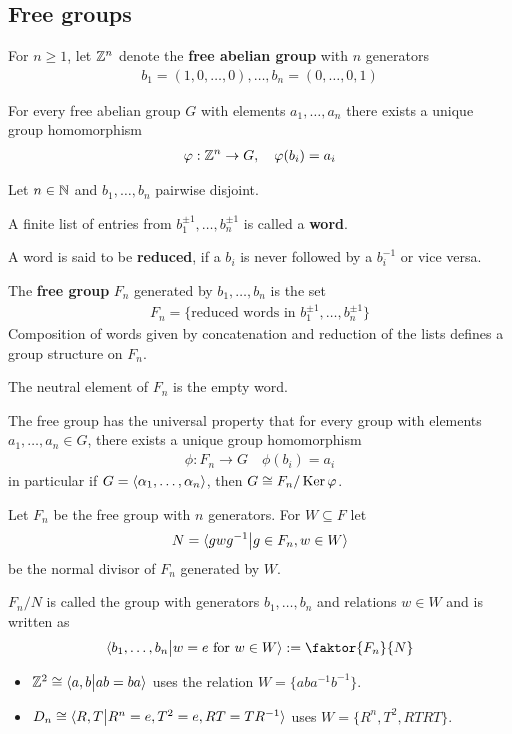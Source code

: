 \subsection{Free groups}
\begin{dfn}[]
For $n \geq 1$, let $\mathbb{Z}^{n}$ denote the \textbf{free abelian group} with $n$ generators
\begin{align*}
  b_1 = (1,0,\ldots,0), \ldots, b_n = (0,\ldots,0,1)
\end{align*}
\end{dfn}


\begin{lem}[]
For every free abelian group $G$ with elements $a_{1}, \ldots, a_{n}$ there exists a unique group homomorphism
\begin{align*}
  \varphi: \mathbb{Z}^{n} \to  G, \quad \varphi(b_i) = a_i
\end{align*}
\end{lem}

\begin{dfn}[]
Let $n \in \mathbb{N}$ and $b_{1}, \ldots, b_{n}$ pairwise disjoint.

A finite list of entries from $b_{1}^{\pm 1}, \ldots,b_{n}^{\pm 1}$ is called a \textbf{word}.

A word is said to be \textbf{reduced}, if a $b_i$ is never followed by a $b_i^{-1}$ or vice versa.

The \textbf{free group} $F_n$ generated by $b_{1}, \ldots, b_{n}$ is the set
\begin{align*}
  F_n = \{\text{reduced words in } b_1^{\pm 1}, \ldots, b_n^{\pm 1}\}
\end{align*}
Composition of words given by concatenation and reduction of the lists defines a group structure on $F_n$.

The neutral element of $F_n$ is the empty word.
\end{dfn}


\begin{thm}[]
The free group has the universal property that for every group with elements $a_{1}, \ldots, a_{n} \in G$, there exists a unique group homomorphism
\begin{align*}
  \phi: F_n \to G \quad \phi(b_i) = a_i
\end{align*}
in particular if $G = \langle\alpha_{1}, \ldots, \alpha_{n}\rangle$, then $G \cong F_n/\operatorname{Ker} \varphi$.
\end{thm}

\begin{dfn}[]
Let $F_n$ be the free group with $n$ generators.
For $W \subseteq F$ let
\begin{align*}
  N = \langle gwg^{-1} \big\vert g \in F_n, w \in W\rangle
\end{align*}
be the normal divisor of $F_n$ generated by $W$.

$F_n/N$ is called the group with generators $b_{1}, \ldots, b_{n}$ and relations $w \in W$ and is written as
\begin{align*}
  \scal{b_{1}, \ldots, b_{n} \big\vert w = e \text{ for } w \in W} := \faktor{F_n}{N}
\end{align*}
\end{dfn}

\begin{itemize}
  \item $\mathbb{Z}^{2} \cong \langle a,b \big\vert ab=ba\rangle$ uses the relation $W = \{aba^{-1}b^{-1}\}$.
  \item $D_n \cong \langle R,T \big\vert R^{n}=e,T^{2}=e,RT=TR^{-1}\rangle$ uses $W = \{R^{n},T^{2},RTRT\}$.
\end{itemize}
